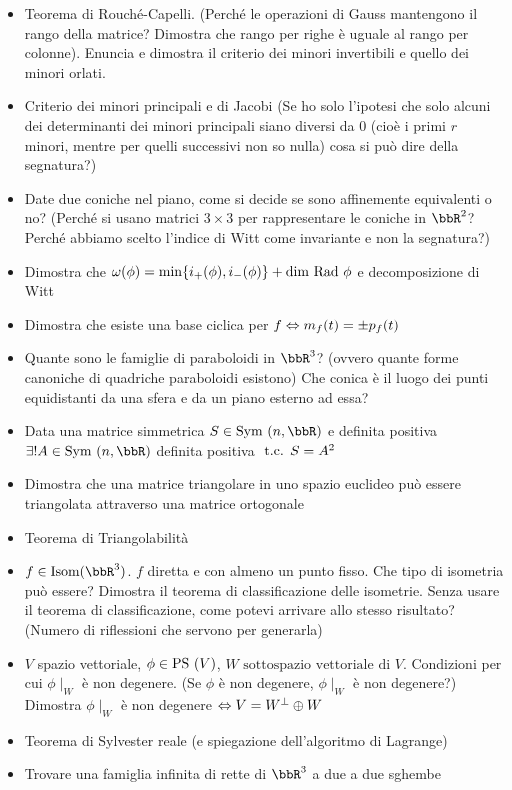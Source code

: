 \documentclass[a4paper,NoNotes,GeneralMath]{stdmdoc}
\newcommand{\ssv}{\mbox{ sottospazio vettoriale di }}
\begin{document}
\begin{itemize}
		\item Teorema di Rouché-Capelli. (Perché le operazioni di Gauss mantengono il rango della matrice? Dimostra che rango per righe è uguale al rango per colonne). Enuncia e dimostra il criterio dei minori invertibili e quello dei minori orlati.
		\item Criterio dei minori principali e di Jacobi (Se ho solo l'ipotesi che solo alcuni dei determinanti dei minori principali siano diversi da $0$ (cioè i primi $r$ minori, mentre per quelli successivi non so nulla) cosa si può dire della segnatura?)
		\item Date due coniche nel piano, come si decide se sono affinemente equivalenti o no? (Perché si usano matrici $3\times 3$ per rappresentare le coniche in $\bbR^2$? Perché abbiamo scelto l'indice di Witt come invariante e non la segnatura?)
		\item Dimostra che $\omega(\phi) = \min \{i_{+}(\phi), i_{-}(\phi)\} + \mbox{dim } \mbox{Rad } \phi$ e decomposizione di Witt
		\item Dimostra che esiste una base ciclica per $f \Leftrightarrow m_f(t) = \pm p_f(t)$
		\item Quante sono le famiglie di paraboloidi in $\bbR^3$? (ovvero quante forme canoniche di quadriche paraboloidi esistono) Che conica è il luogo dei punti equidistanti da una sfera e da un piano esterno ad essa?
		\item Data una matrice simmetrica $S \in \Symm(n,\bbR)$ e definita positiva $\exists ! A \in \Symm(n, \bbR)$ definita positiva $\mbox{ t.c. } S = A^2$
		\item Dimostra che una matrice triangolare in uno spazio euclideo può essere triangolata attraverso una matrice ortogonale
		\item Teorema di Triangolabilità
		\item $f \in \Isom(\bbR^3)$. $f$ diretta e con almeno un punto fisso. Che tipo di isometria può essere? Dimostra il teorema di classificazione delle isometrie. Senza usare il teorema di classificazione, come potevi arrivare allo stesso risultato? (Numero di riflessioni che servono per generarla)
		\item $V$ spazio vettoriale, $\phi \in \mbox{PS }(V)$, $W \ssv V$. Condizioni per cui $\phi\mid_W$ è non degenere. (Se $\phi$ è non degenere, $\phi\mid_W$ è non degenere?) Dimostra $\phi\mid_W$ è non degenere $\Leftrightarrow V = W^\bot \oplus W$
		\item Teorema di Sylvester reale (e spiegazione dell'algoritmo di Lagrange)
		\item Trovare una famiglia infinita di rette di $\bbR^3$ a due a due sghembe

\end{itemize}
\end{document}
